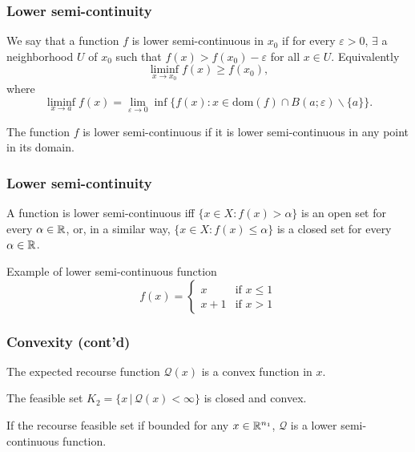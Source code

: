 \documentclass{beamer}
\begin{document}
\begin{frame}
\frametitle{Lower semi-continuity}

We say that a function $f$ is {\blue lower semi-continuous in $x_0$} if for every $\varepsilon > 0$, $\exists$ a neighborhood $U$ of $x_0$ such that $f(x) > f(x_0) - \varepsilon$ for all $x \in U$.
Equivalently
\[
\liminf_{x \to x_{0}} f(x) \geq f(x_{0}),
\]
where
\[
\liminf_{x \to a} f(x) = \lim_{\varepsilon \to 0} \inf \{ f(x) : x
\in \mbox{dom}(f) \cap B(a;\varepsilon) \backslash \{a\} \}.
\]

\mbox{}

The function $f$ is {\blue lower semi-continuous} if it is lower semi-continuous in any point in its domain.

\end{frame}

\begin{frame}
\frametitle{Lower semi-continuity}


A function is lower semi-continuous iff $\lbrace x\in X : f(x) > \alpha \rbrace$ is an open set for every  $\alpha \in {\mathbb{R}}$, or, in a similar way, $\lbrace x\in X : f(x) \leq \alpha \rbrace$ is a closed set for every $\alpha \in {\mathbb{R}}$.

\mbox{}

Example of lower semi-continuous function
$$
f(x) =
\begin{cases}
x & \text{if } x \leq 1 \\
x + 1 & \text{if } x > 1
\end{cases}
$$

\end{frame}

\begin{frame}
\frametitle{Convexity (cont'd)}

\begin{corollary}
The expected recourse function $\mathcal{Q}(x)$ is a convex function in $x$.
\end{corollary}

\begin{corollary}
The feasible set $K_2 = \lbrace x \,|\, \mathcal{Q}(x) < \infty \rbrace$ is closed and convex.
\end{corollary}

\begin{corollary}
If the recourse feasible set if bounded for any $x \in {\mathbb{R}}^{n_1}$, $\mathcal{Q}$ is a lower semi-continuous function.
\end{corollary}

\end{frame}
\end{document}
